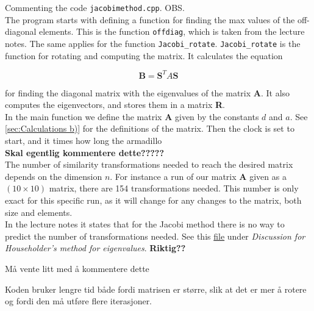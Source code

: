 \documentclass{article}
\begin{document}
Commenting the code \texttt{jacobimethod.cpp}.  OBS. \\

The program starts with defining a function for finding the max values of the off-diagonal elements. This is the function \texttt{offdiag}, which is taken from the lecture notes. The same applies for the function \texttt{Jacobi\_rotate}. \texttt{Jacobi\_rotate} is the function for rotating and computing the matrix. It calculates the equation

\begin{equation*}
    \textbf{B} = \textbf{S}^T A \textbf{S}
\end{equation*}

for finding the diagonal matrix with the eigenvalues of the matrix \textbf{A}. It also computes the eigenvectors, and stores them in a matrix \textbf{R}. \\

In the main function we define the matrix \textbf{A} given by the constants $d$ and $a$. See \ref{sec:Calculations b)} for the definitions of the matrix. Then the clock is set to start, and it times how long the armadillo \\

\textbf{Skal egentlig kommentere dette?????} \\

The number of similarity transformations needed to reach the desired matrix depends on the dimension $n$. For instance a run of our matrix \textbf{A} given as a $(10 \times 10)$ matrix, there are 154 transformations needed. This number is only exact for this specific run, as it will change for any changes to the matrix, both size and elements. \\

In the lecture notes it states that for the Jacobi method there is no way to predict the number of transformations needed. See this \href{http://compphysics.github.io/ComputationalPhysics/doc/pub/eigvalues/html/eigvalues.html}{file} under \textit{Discussion for Householder's method for eigenvalues}. \textbf{Riktig??} \\





\vspace{3cm}

Må vente litt med å kommentere dette

Koden bruker lengre tid både fordi matrisen er større, slik at det er mer å rotere og fordi den må
utføre flere iterasjoner.
\end{document}
